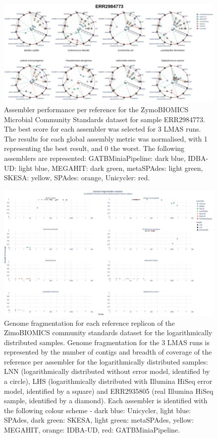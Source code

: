 \begin{figure}[]
\centering
\includegraphics[width=\textwidth]{figures/chapter 5/Supplemental Figure 6.png}
\caption{Assembler performance per reference for the ZymoBIOMICS Microbial Community Standards dataset for sample ERR2984773. The best score for each assembler was selected for 3 LMAS runs. The results for each global assembly metric was normalised, with 1 representing the best result, and 0 the worst. The following assemblers are represented: GATBMiniaPipeline: dark blue, IDBA-UD: light blue, MEGAHIT: dark green, metaSPAdes: light green, SKESA: yellow, SPAdes: orange, Unicycler: red.}
\label{fig:chap5_sup_figure_6}
\end{figure}

\begin{figure}[]
\centering
\includegraphics[width=\textwidth]{figures/chapter 5/Supplemental Figure 7.png}
\caption{Genome fragmentation for each reference replicon of the ZimoBIOMICS community standards dataset for the logarithmically distributed samples. Genome fragmentation for the 3 LMAS runs is represented by the number of contigs and breadth of coverage of the reference per assembler for the logarithmically distributed samples: LNN (logarithmically distributed without error model, identified by a circle), LHS (logarithmically distributed with Illumina HiSeq error model, identified by a square) and ERR2935805 (real Illumina HiSeq sample, identified by a diamond). Each assembler is identified with the following colour scheme - dark blue: Unicycler, light blue: SPAdes, dark green: SKESA, light green: metaSPAdes, yellow: MEGAHIT, orange: IDBA-UD, red: GATBMiniaPipeline.}
\label{fig:chap5_sup_figure_7}
\end{figure}


